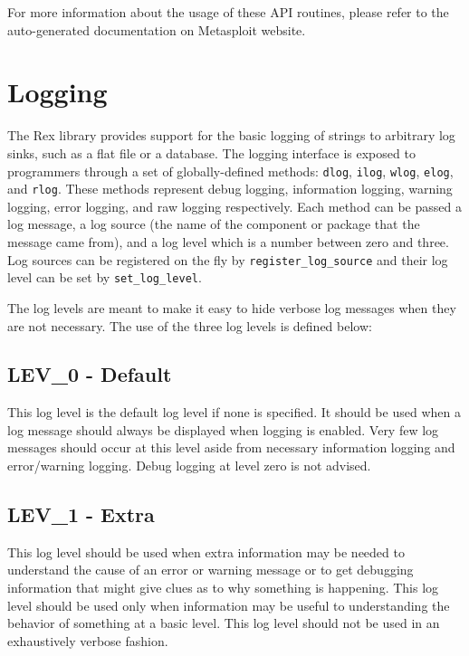 \documentclass{report}
\begin{document}
\par
For more information about the usage of these API routines, please
refer to the auto-generated documentation on Metasploit website.

    \section{Logging}

\par
The Rex library provides support for the basic logging of strings to
arbitrary log sinks, such as a flat file or a database.  The logging
interface is exposed to programmers through a set of
globally-defined methods: \texttt{dlog}, \texttt{ilog},
\texttt{wlog}, \texttt{elog}, and \texttt{rlog}.  These methods
represent debug logging, information logging, warning logging, error
logging, and raw logging respectively.  Each method can be passed a
log message, a log source (the name of the component or package that
the message came from), and a log level which is a number between
zero and three.  Log sources can be registered on the fly by
\texttt{register\_log\_source} and their log level can be set by
\texttt{set\_log\_level}.

\par
The log levels are meant to make it easy to hide verbose log
messages when they are not necessary.  The use of the three log
levels is defined below:

        \subsection{LEV\_0 - Default}

This log level is the default log level if none is specified.  It
should be used when a log message should always be displayed when
logging is enabled. Very few log messages should occur at this level
aside from necessary information logging and error/warning logging.
Debug logging at level zero is not advised.

        \subsection{LEV\_1 - Extra}

This log level should be used when extra information may be needed
to understand the cause of an error or warning message or to get
debugging information that might give clues as to why something is
happening.  This log level should be used only when information may
be useful to understanding the behavior of something at a basic
level.  This log level should not be used in an exhaustively verbose
fashion.
\end{document}
